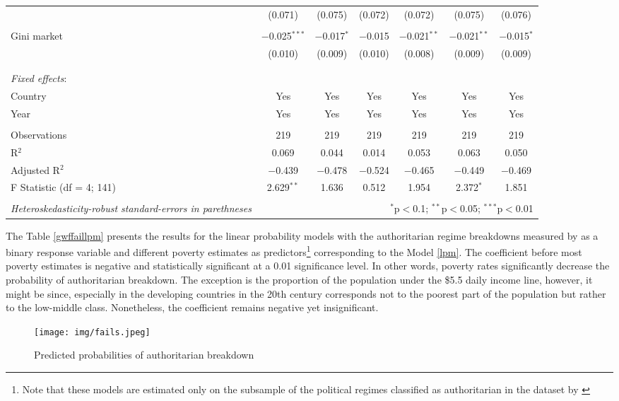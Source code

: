 \documentclass[a4paper, 12pt]{article}
\begin{document}
\begin{table}[!htbp]
{\begin{tabular}{@{\extracolsep{5pt}}lcccccc}
  & (0.071) & (0.075) & (0.072) & (0.072) & (0.075) & (0.076) \\ 
  & & & & & & \\ 
 Gini market & $-$0.025$^{***}$ & $-$0.017$^{*}$ & $-$0.015 & $-$0.021$^{**}$ & $-$0.021$^{**}$ & $-$0.015$^{*}$ \\ 
  & (0.010) & (0.009) & (0.010) & (0.008) & (0.009) & (0.009) \\ 
  & & & & & & \\ 
 \hline \\[-1.8ex] 
 \textit{Fixed effects}:\\
Country & Yes & Yes & Yes & Yes & Yes & Yes\\
Year & Yes & Yes & Yes & Yes & Yes & Yes\\
\hline \\[-1.8ex] 
Observations & 219 & 219 & 219 & 219 & 219 & 219 \\ 
R$^{2}$ & 0.069 & 0.044 & 0.014 & 0.053 & 0.063 & 0.050 \\ 
Adjusted R$^{2}$ & $-$0.439 & $-$0.478 & $-$0.524 & $-$0.465 & $-$0.449 & $-$0.469 \\ 
F Statistic (df = 4; 141) & 2.629$^{**}$ & 1.636 & 0.512 & 1.954 & 2.372$^{*}$ & 1.851 \\ 
\hline 
\hline \\[-1.8ex] 
\footnotesize{\textit{Heteroskedasticity-robust standard-errors in parethneses}} & \multicolumn{6}{r}{$^{*}$p$<$0.1; $^{**}$p$<$0.05; $^{***}$p$<$0.01} \\ 
\end{tabular} 
}
\end{table} 
 
	
	
	\noindent The Table \ref{gwffaillpm} presents the results for the linear probability models with the authoritarian regime breakdowns measured by \cite{geddesdata} as a binary response variable and different poverty estimates as predictors\footnote{Note that these models are estimated only on the subsample of the political regimes classified as authoritarian in the dataset by \cite{geddesdata}} corresponding to the Model \eqref{lpm}. The coefficient before most poverty estimates is negative and statistically significant at a 0.01 significance level. In other words, poverty rates significantly decrease the probability of authoritarian breakdown.
	The exception is the proportion of the population under the \$5.5 daily income line, however, it might be since, especially in the developing countries in the 20th century corresponds not to the poorest part of the population but rather to the low-middle class. Nonetheless, the coefficient remains negative yet insignificant.
	\\
    \begin{figure}[!ht]
        \centering
        \texttt{[image: img/fails.jpeg]}
        \caption{Predicted probabilities of authoritarian breakdown}
        \label{fig:fails}
    \end{figure}
    
\end{document}
